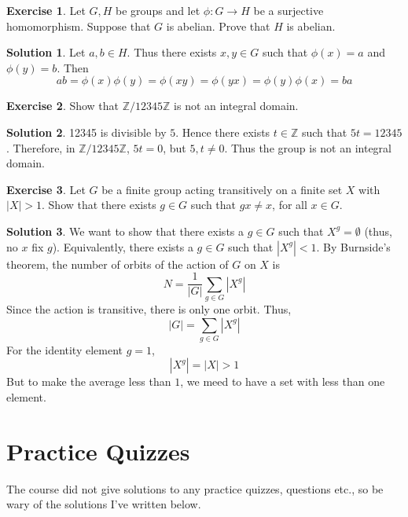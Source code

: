 \documentclass[12pt]{article}
\theoremstyle{definition}
\newcommand{\Z}{\mathbb{Z}}
\newtheorem{exercise}{\color{YellowOrange}Exercise}
\theoremstyle{definition}
\newtheorem{solution}{\color{Goldenrod}Solution}
\begin{document}
\begin{exercise}
	Let $G,H$ be groups and let $\phi : G \to H$ be a surjective homomorphism. Suppose that $G$ is abelian. Prove that $H$ is abelian.
\end{exercise}
\begin{solution}
	Let $a,b \in H$. Thus there exists $x,y \in G$ such that $\phi(x) = a$ and $\phi(y) = b$. Then
	\begin{equation}
		ab = \phi(x)\phi(y) = \phi(xy) = \phi(yx) = \phi(y)\phi(x) = ba
	\end{equation}
\end{solution}

\begin{exercise}
	Show that $\Z / 12345\Z$ is not an integral domain.
\end{exercise}
\begin{solution}
	12345 is divisible by $5$. Hence there exists $t \in \Z$ such that $5t = 12345$. Therefore, in $\Z / 12345\Z$, $5t = 0$, but $5,t \neq 0$. Thus the group is not an integral domain. 
\end{solution}

\begin{exercise}
	Let $G$ be a finite group acting transitively on a finite set $X$ with $|X| > 1$. Show that there exists $g \in G$ such that $gx \neq x$, for all $x \in G$. 
\end{exercise}
\begin{solution}
	We want to show that there exists a $g \in G$ such that $X^g = \emptyset$ (thus, no $x$ fix $g$). Equivalently, there exists a $g \in G$ such that $|X^g| < 1$. By Burnside's theorem, the number of orbits of the action of $G$ on $X$ is
	\begin{equation}
		N = \frac{1}{|G|} \sum_{g\in G} |X^g|
	\end{equation}
	Since the action is transitive, there is only one orbit. Thus,
	\begin{equation}
		|G| = \sum_{g\in G} |X^g|
	\end{equation}
	For the identity element $g =1$,
	\begin{equation}
		|X^g| = |X| > 1
	\end{equation}
	But to make the average less than $1$, we meed to have a set with less than one element. 
\end{solution}
	
\section{Practice Quizzes}
The course did not give solutions to any practice quizzes, questions etc., so be wary of the solutions I've written below. 
\end{document}
